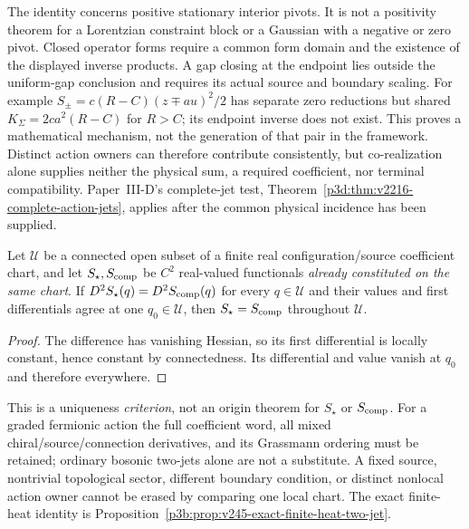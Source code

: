 \documentclass[12pt,a4paper]{article}
\begin{document}
\begin{remark}
\label{p3a:rem:v2216-multiaction-scope}
The identity concerns positive stationary interior pivots. It is not a
positivity theorem for a Lorentzian constraint block or a Gaussian with a
negative or zero pivot. Closed operator forms require a common form domain
and the existence of the displayed inverse products. A gap closing at the
endpoint lies outside the uniform-gap conclusion and requires its actual
source and boundary scaling. For example
$S_\pm=c(R-C)(z\mp au)^2/2$ has separate zero reductions but shared
$K_\Sigma=2ca^2(R-C)$ for $R>C$; its endpoint inverse does not exist.
This proves a mathematical mechanism, not the generation of that pair in the
framework. Distinct action owners can therefore contribute consistently,
but co-realization alone supplies neither the physical sum, a required
coefficient, nor terminal compatibility. Paper~III-D's complete-jet test,
Theorem~\ref{p3d:thm:v2216-complete-action-jets}, applies after the common
physical incidence has been supplied.
\end{remark}


\begin{proposition}
\label{p3a:prop:v245-common-action-two-jet-equality}
Let $\mathcal U$ be a connected open subset of a finite real
configuration/source coefficient chart, and let $S_\star,S_{\rm comp}$
be $C^2$ real-valued functionals \emph{already constituted on the same
chart}. If $D^2S_\star(q)=D^2S_{\rm comp}(q)$ for every $q\in\mathcal U$
and their values and first differentials agree at one $q_0\in\mathcal U$,
then $S_\star=S_{\rm comp}$ throughout $\mathcal U$.
\end{proposition}
\begin{proof}
The difference has vanishing Hessian, so its first differential is
locally constant, hence constant by connectedness. Its differential
and value vanish at $q_0$ and therefore everywhere.
\end{proof}
\begin{remark}
\label{p3a:rem:v245-two-jet-owner-firewall}
This is a uniqueness \emph{criterion}, not an origin theorem for
$S_\star$ or $S_{\rm comp}$. For a graded fermionic action the full
coefficient word, all mixed chiral/source/connection derivatives, and
its Grassmann ordering must be retained; ordinary bosonic two-jets
alone are not a substitute. A fixed source, nontrivial topological
sector, different boundary condition, or distinct nonlocal action
owner cannot be erased by comparing one local chart.
The exact finite-heat identity is
Proposition~\ref{p3b:prop:v245-exact-finite-heat-two-jet}.
\end{remark}
\end{document}
